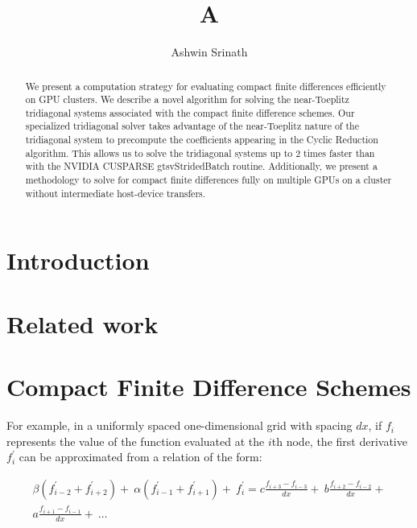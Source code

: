 \documentclass{elsarticle}
\begin{document}
\begin{frontmatter}
\author{Ashwin Srinath}
\title{A}
\maketitle

\begin{abstract}
    We present a computation strategy for evaluating
    compact finite differences efficiently on GPU clusters.
    We describe a novel algorithm for solving the
    near-Toeplitz tridiagonal systems associated with
    the compact finite difference schemes.
    Our specialized tridiagonal solver
    takes advantage of the near-Toeplitz nature of the
    tridiagonal system to precompute the coefficients
    appearing in the Cyclic Reduction algorithm.
    This allows us to solve the tridiagonal systems
    up to 2 times faster than with the NVIDIA CUSPARSE
    gtsvStridedBatch routine.
    Additionally, we present a methodology to solve for
    compact finite differences fully on multiple GPUs on a cluster
    without intermediate host-device transfers.
\end{abstract}

\end{frontmatter}
    
\section{Introduction}

\section{Related work}
      
\section{Compact Finite Difference Schemes}

For example,
in a uniformly spaced one-dimensional grid with spacing $dx$,
if $f_i$ represents the value of
the function evaluated at the $i$th node,
the first derivative $f^{\prime}_i$ can be approximated from
a relation of the form:

\begin{equation}
\begin{split}
    \beta(f^{\prime}_{i-2} + f^{\prime}_{i+2}) + \
    \alpha(f^{\prime}_{i-1} + f^{\prime}_{i+1}) + \
        f^{\prime}_i
    = 
    c\frac{f_{i+3} - f_{i-3}}{dx} + \
    b\frac{f_{i+2} - f_{i-2}}{dx} + \\
    a\frac{f_{i+1} - f_{i-1}}{dx} + \
    \hdots
\end{split}
\label{eqn:general-compact}
\end{equation}
\end{document}
